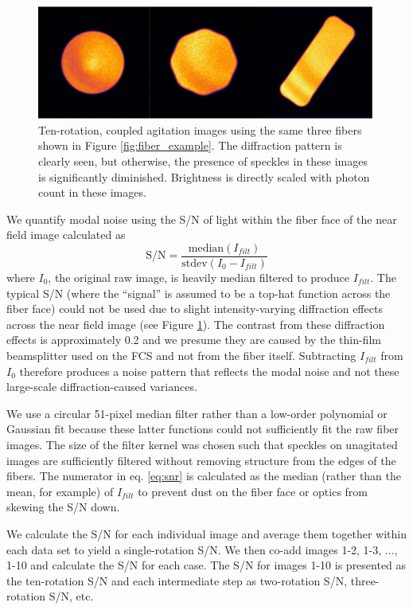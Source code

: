 \documentclass[twocolumn]{emulateapj}
\begin{document}
\begin{figure}
\centering
	\includegraphics[width=\columnwidth]{images/fiber_improved.pdf}
	\caption{Ten-rotation, coupled agitation images using the same three fibers shown in Figure \ref{fig:fiber_example}.  The diffraction pattern is clearly seen, but otherwise, the presence of speckles in these images is significantly diminished. Brightness is directly scaled with photon count in these images.}
\label{fig:fiber_improved}
\end{figure}

We quantify modal noise using the S/N of light within the fiber face of the near field image calculated as
\begin{equation}
\mathrm{S/N} = \frac{\mathrm{median}(I_{filt})}{\mathrm{stdev}(I_0 - I_{filt})}
\label{eq:snr}
\end{equation}
where $I_0$, the original raw image, is heavily median filtered to produce $I_{filt}$. The typical S/N (where the ``signal'' is assumed to be a top-hat function across the fiber face) could not be used due to slight intensity-varying diffraction effects across the near field image (see Figure \ref{fig:fiber_improved}). The contrast from these diffraction effects is approximately 0.2 and we presume they are caused by the thin-film beamsplitter used on the FCS and not from the fiber itself. Subtracting $I_{filt}$ from $I_0$ therefore produces a noise pattern that reflects the modal noise and not these large-scale diffraction-caused variances.

We use a circular 51-pixel median filter rather than a low-order polynomial or Gaussian fit because these latter functions could not sufficiently fit the raw fiber images. The size of the filter kernel was chosen such that speckles on unagitated images are sufficiently filtered without removing structure from the edges of the fibers. The numerator in eq. \ref{eq:snr} is calculated as the median (rather than the mean, for example) of $I_{filt}$ to prevent dust on the fiber face or optics from skewing the S/N down.

We calculate the S/N for each individual image and average them together within each data set to yield a single-rotation S/N. We then co-add images 1-2, 1-3, ..., 1-10 and calculate the S/N for each case. The S/N for images 1-10 is presented as the ten-rotation S/N and each intermediate step as two-rotation S/N, three-rotation S/N, etc.
\end{document}
